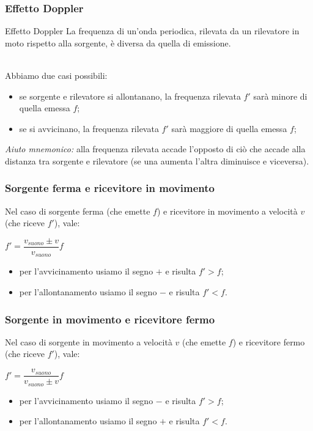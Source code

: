 \documentclass[]{beamer}
\theoremstyle{plain}
\begin{document}
\begin{frame}
\frametitle{Effetto Doppler}
\begin{block}{Effetto Doppler}
La frequenza di un'onda periodica, rilevata da un rilevatore in moto rispetto alla sorgente, è diversa da quella di emissione.
\end{block}\pause~\\

Abbiamo due casi possibili:
\begin{itemize}
  \item se sorgente e rilevatore \alert<2>{si allontanano}, la frequenza rilevata $ f' $ sarà \alert<2>{minore} di quella emessa $ f $;\pause
  \item se \alert<3>{si avvicinano}, la frequenza rilevata $ f' $ sarà \alert<3>{maggiore} di quella emessa $ f $;\pause
 \end{itemize}
  
\emph{Aiuto mnemonico:} \alert<4>{alla frequenza rilevata accade l'opposto di ciò che accade alla distanza tra sorgente e rilevatore} (se una aumenta l'altra diminuisce e viceversa).

\end{frame}


\begin{frame}
\frametitle{Sorgente ferma e ricevitore in movimento}
Nel caso di sorgente ferma (che emette $ f $) e ricevitore in movimento a velocità $ v $ (che riceve $ f' $), vale:
\begin{center}
\colorbox{blue!30}{$ f' = \dfrac{v_{suono} \pm v}{v_{suono}} f $}
\end{center}
\begin{itemize}
  \item per l'avvicinamento usiamo il segno $ + $ e risulta $ f' > f $;
  \item per l'allontanamento usiamo il segno $ - $ e risulta $ f' < f $.
\end{itemize}
\end{frame}



\begin{frame}
\frametitle{Sorgente in movimento e ricevitore fermo}
Nel caso di sorgente in movimento a velocità $ v $ (che emette $ f $) e  ricevitore fermo (che riceve $ f' $), vale:
\begin{center}
\colorbox{blue!30}{$ f' = \dfrac{v_{suono}}{v_{suono}  \pm v} f $}
\end{center}
\begin{itemize}
  \item per l'avvicinamento usiamo il segno $ - $ e risulta $ f' > f $;
  \item per l'allontanamento usiamo il segno $ + $ e risulta $ f' < f $.
\end{itemize}
\end{frame}
\end{document}
